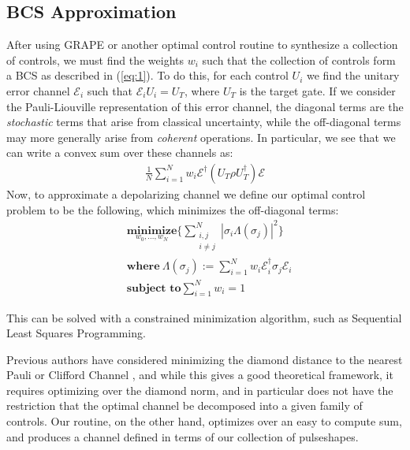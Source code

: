 \documentclass[aps,nofootinbib,pra,notitlepage,twocolumn]{revtex4-1}
\begin{document}
\subsection{BCS Approximation}
After using GRAPE or another optimal control routine to synthesize a collection of controls, we must find the weights $w_i$ such that the collection of controls form a BCS as described in (\ref{eq:1}). To do this, for each control $U_i$ we find the unitary error channel $\mathcal{E}_i$ such that $\mathcal{E}_iU_i=U_T$, where $U_T$ is the target gate. If we consider the Pauli-Liouville representation\cite{Kimmel2014} of this error channel, the diagonal terms are the \textit{stochastic} terms that arise from classical uncertainty, while the off-diagonal terms may more generally arise from \textit{coherent} operations. In particular, we see that we can write a convex sum over these channels as:
\begin{align}
 \frac{1}{N} \sum^N_{i=1} w_i \mathcal{E}^{\dagger} (U_T\rho U_T^{\dagger}) \mathcal{E}
\end{align}
Now, to approximate a depolarizing channel we define our optimal control problem to be the following, which minimizes the off-diagonal terms:
\begin{equation}\label{eq:minimization}
  \begin{split}
    &\underset{w_0, ..., w_N}{\textbf{minimize}} \{\sum_{\substack{i,j \\ i\neq j}}^N|\sigma_i\Lambda(\sigma_j)|^2\}\\
    &\textbf{where}\ \Lambda(\sigma_j) := \sum^N_{i=1}w_i\mathcal{E}_i^{\dagger}\sigma_j\mathcal{E}_i\\
    &\textbf{subject to} \sum_{i=1}^Nw_i = 1
  \end{split}
\end{equation}

This can be solved with a constrained minimization algorithm, such as Sequential Least Squares Programming\cite{wright1999numerical}.

Previous authors have considered minimizing the diamond distance to the nearest Pauli or Clifford Channel \cite{Magesan2013}, and while this gives a good theoretical framework, it requires optimizing over the diamond norm, and in particular does not have the restriction that the optimal channel be decomposed into a given family of controls. Our routine, on the other hand, optimizes over an easy to compute sum, and produces a channel defined in terms of our collection of pulseshapes.
\end{document}
